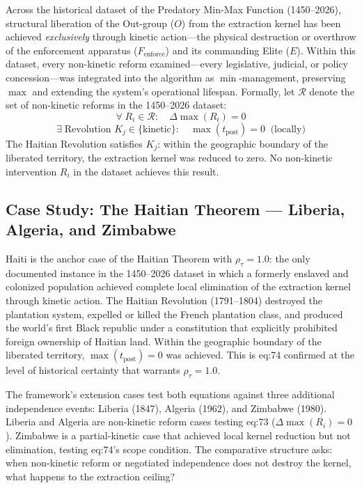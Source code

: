 \begin{definition}
\label{def:haitian_theorem}
Across the historical dataset of the Predatory Min-Max Function (1450--2026), structural liberation of the Out-group ($O$) from the extraction kernel has been achieved \textit{exclusively} through kinetic action---the physical destruction or overthrow of the enforcement apparatus ($F_{\text{enforce}}$) and its commanding Elite ($E$). Within this dataset, every non-kinetic reform examined---every legislative, judicial, or policy concession---was integrated into the algorithm as $\min$-management, preserving $\max$ and extending the system's operational lifespan. Formally, let $\mathcal{R}$ denote the set of non-kinetic reforms in the 1450--2026 dataset:
\begin{equation}\label{eq:12.5-haitian-theorem-nonkinetic}
\forall\; R_i \in \mathcal{R}: \quad \Delta\max(R_i) = 0
\end{equation}
\begin{equation}\label{eq:12.6-haitian-theorem-kinetic}
\exists\; \text{Revolution } K_j \in \{\text{kinetic}\}: \quad \max(t_{\text{post}}) = 0 \;\;\text{(locally)}
\end{equation}
The Haitian Revolution satisfies $K_j$: within the geographic boundary of the liberated territory, the extraction kernel was reduced to zero. No non-kinetic intervention $R_i$ in the dataset achieves this result.
\end{definition}

\subsection*{Case Study: The Haitian Theorem --- Liberia, Algeria, and Zimbabwe}

Haiti is the anchor case of the Haitian Theorem with $\rho_\tau = 1.0$: the only documented instance in the 1450--2026 dataset in which a formerly enslaved and colonized population achieved complete local elimination of the extraction kernel through kinetic action. The Haitian Revolution (1791--1804) destroyed the plantation system, expelled or killed the French plantation class, and produced the world's first Black republic under a constitution that explicitly prohibited foreign ownership of Haitian land. Within the geographic boundary of the liberated territory, $\max(t_{\text{post}}) = 0$ was achieved. This is eq:74 confirmed at the level of historical certainty that warrants $\rho_\tau = 1.0$.

The framework's extension cases test both equations against three additional independence events: Liberia (1847), Algeria (1962), and Zimbabwe (1980). Liberia and Algeria are non-kinetic reform cases testing eq:73 ($\Delta\max(R_i) = 0$). Zimbabwe is a partial-kinetic case that achieved local kernel reduction but not elimination, testing eq:74's scope condition. The comparative structure asks: when non-kinetic reform or negotiated independence does not destroy the kernel, what happens to the extraction ceiling?

